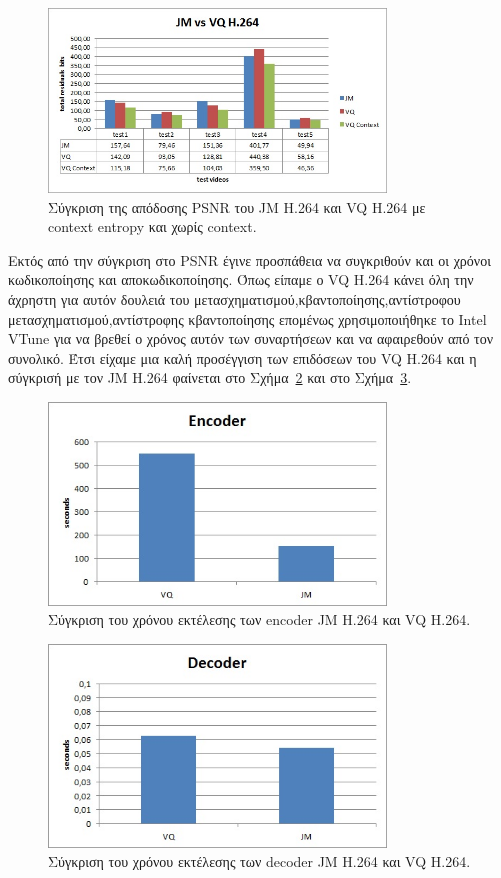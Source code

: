 \begin{figure}[H]
    \centering
    \includegraphics[width=0.8\textwidth]{chapter6/compare1.jpg}
    \caption{Σύγκριση της απόδοσης PSNR του JM H.264 και VQ H.264 με context entropy και χωρίς context.}
    \label{fig:compare1}
\end{figure}

\indent Εκτός από την σύγκριση στο PSNR έγινε προσπάθεια να συγκριθούν και οι χρόνοι κωδικοποίησης και αποκωδικοποίησης. Όπως είπαμε ο VQ Η.264 κάνει όλη την άχρηστη για αυτόν δουλειά του μετασχηματισμού,κβαντοποίησης,αντίστροφου μετασχηματισμού,αντίστροφης κβαντοποίησης επομένως χρησιμοποιήθηκε το Intel VTune για να βρεθεί ο χρόνος αυτόν των συναρτήσεων και να αφαιρεθούν από τον συνολικό. Έτσι είχαμε μια καλή προσέγγιση των επιδόσεων του VQ H.264 και η σύγκρισή με τον JM H.264 φαίνεται στο Σχήμα~\ref{fig:compare2} και στο Σχήμα~\ref{fig:compare3}.

 \begin{figure}[H]
    \centering
    \includegraphics[width=0.8\textwidth]{chapter6/compare2.jpg}
    \caption{Σύγκριση του χρόνου εκτέλεσης των encoder JM H.264 και VQ H.264.}
    \label{fig:compare2}
\end{figure}

 \begin{figure}[H]
    \centering
    \includegraphics[width=0.8\textwidth]{chapter6/compare3.jpg}
    \caption{Σύγκριση του χρόνου εκτέλεσης των decoder JM H.264 και VQ H.264.}
    \label{fig:compare3}
\end{figure}